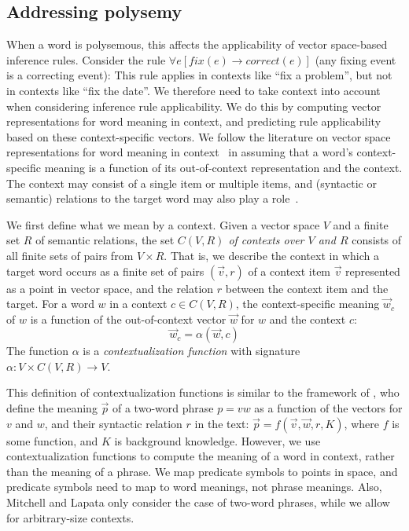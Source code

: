 \subsection*{Addressing polysemy}

When a word is polysemous, this affects the applicability of vector
space-based inference rules. Consider the rule $\forall e[fix(e) \to
correct(e)]$ (any fixing event is a correcting event): This rule
applies in contexts like ``fix a problem'', but not in contexts like
``fix the date''. We therefore need to take context into account when
considering inference rule applicability. We do this by computing
vector representations for word meaning in context, and predicting
rule applicability based on these context-specific vectors. We follow
the literature on vector space representations for word meaning in context~\citep{erk:emnlp08,ThaterFuerstenauPinkal:10,ReisingerMooney:10,dinu-lapata:2010:EMNLP,vandecruys:emnlp2011}
in assuming that a word's context-specific meaning is a function of its
out-of-context representation and the context. The context may consist
of a single item or multiple items, and (syntactic or semantic) relations to the
target word may also play a
role~\citep{erk:emnlp08,ThaterFuerstenauPinkal:10,vandecruys:emnlp2011}. 

We
first define what we mean by a context. Given a vector space $V$ and a
finite set $R$ of semantic relations, the set
\textit{$C(V, R)$ of contexts over $V$ and $R$} consists of all finite sets of
pairs from $V \times R$.  That is, we describe the context in which a
target word occurs as a finite set of pairs $(\vec v, r)$ of a context
item $\vec v$ represented as a point in vector space, and the relation $r$
between the context item and the target. 
For a word $w$ in a context $c
\in C(V, R)$, the context-specific meaning $\vec w_c$ of $w$ is a
function of the out-of-context vector $\vec w$ for $w$ and the context
$c$:
\[\vec w_c = \alpha(\vec w, c)\]
The function $\alpha$ is a \emph{contextualization function} with
signature $\alpha: V \times C(V, R) \to V$. 

This definition of contextualization functions is similar to the
framework of \citet{MitchellLapata:08}, who define the meaning $\vec p$
of a two-word phrase $p = vw$ as a function of the vectors for $v$ and $w$, and their
syntactic relation $r$ in the text: $\vec p = f(\vec v, \vec w, r, K)$,  where $f$ is some function, and $K$ is background
knowledge. However, we use contextualization functions to compute the meaning of a word in
context, rather than the meaning of a phrase. We map predicate
symbols to points in space, and predicate symbols need to map to word meanings, not phrase
meanings. Also, Mitchell and Lapata only consider the case of two-word
phrases, while we allow for arbitrary-size contexts. 


